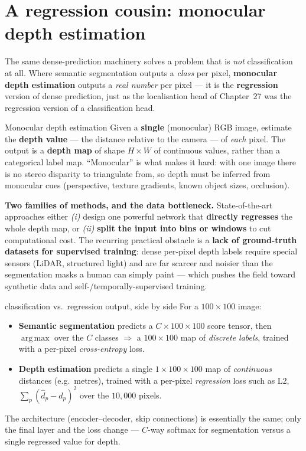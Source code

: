\documentclass{report}
\DeclareMathOperator*{\argmax}{arg\,max}
\begin{document}
\section{A regression cousin: monocular depth estimation}

The same dense-prediction machinery solves a problem that is \emph{not}
classification at all. Where semantic segmentation outputs a \emph{class} per
pixel, \textbf{monocular depth estimation} outputs a \emph{real number} per
pixel --- it is the \textbf{regression} version of dense prediction, just as
the localisation head of Chapter~27 was the regression version of a
classification head.

\begin{defbox}{Monocular depth estimation}
Given a \textbf{single} (monocular) RGB image, estimate the \textbf{depth
value} --- the distance relative to the camera --- of \emph{each} pixel. The
output is a \textbf{depth map} of shape $H\times W$ of continuous values, rather
than a categorical label map. ``Monocular'' is what makes it hard: with one
image there is no stereo disparity to triangulate from, so depth must be
inferred from monocular cues (perspective, texture gradients, known object
sizes, occlusion).
\end{defbox}

\begin{keybox}
\textbf{Two families of methods, and the data bottleneck.} State-of-the-art
approaches either \emph{(i)} design one powerful network that \textbf{directly
regresses} the whole depth map, or \emph{(ii)} \textbf{split the input into bins
or windows} to cut computational cost. The recurring practical obstacle is a
\textbf{lack of ground-truth datasets for supervised training}: dense
per-pixel depth labels require special sensors (LiDAR, structured light) and are
far scarcer and noisier than the segmentation masks a human can simply paint ---
which pushes the field toward synthetic data and self-/temporally-supervised
training.
\end{keybox}

\begin{exbox}{classification vs.\ regression output, side by side}
For a $100\times100$ image:
\begin{itemize}
\item \textbf{Semantic segmentation} predicts a $C\times100\times100$ score
tensor, then $\argmax$ over the $C$ classes $\Rightarrow$ a $100\times100$ map
of \emph{discrete labels}, trained with a per-pixel \emph{cross-entropy} loss.
\item \textbf{Depth estimation} predicts a single $1\times100\times100$ map of
\emph{continuous} distances (e.g.\ metres), trained with a per-pixel
\emph{regression} loss such as L2, $\sum_{p}(\hat d_p - d_p)^2$ over the
$10{,}000$ pixels.
\end{itemize}
The architecture (encoder--decoder, skip connections) is essentially the same;
only the final layer and the loss change --- $C$-way softmax for segmentation
versus a single regressed value for depth.
\end{exbox}
\end{document}
